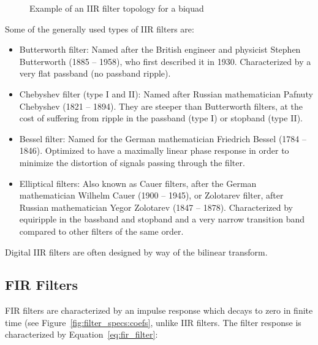 \begin{figure}
    \centering
    
    \caption[IIR Filter: Biquad]{Example of an IIR filter topology for a biquad}
    \label{fig:filtertopologies:iir}
\end{figure}

Some of the generally used types of IIR filters are:
\begin{itemize}\tightlist
    \item
        Butterworth  filter: Named after  the British  engineer and  physicist
        Stephen  Butterworth  (1885  --  1958),  who  first  described  it  in
        1930. Characterized by a very flat passband (no passband ripple).
    \item
        Chebyshev filter  (type I  and II): Named after  Russian mathematician
        Pafnuty Chebyshev  (1821 --  1894). They are steeper  than Butterworth
        filters, at the cost of suffering from ripple in the passband (type I)
        or stopband (type II).
    \item
        Bessel  filter: Named for  the German  mathematician Friedrich  Bessel
        (1784 -- 1846). Optimized to have a maximally linear phase response in
        order  to  minimize the  distortion  of  signals passing  through  the
        filter.
    \item
        Elliptical  filters: Also known  as  Cauer filters,  after the  German
        mathematician Wilhelm Cauer (1900 -- 1945), or Zolotarev filter, after
        Russian mathematician Yegor Zolotarev (1847 -- 1878). Characterized by
        equiripple in the  bassband and stopband and a  very narrow transition
        band compared to other filters of the same order.
\end{itemize}
Digital IIR filters are often designed by way of the bilinear transform.

%
%
\subsection{FIR Filters} %
\label{subsec:FIR_filters}

FIR filters are  characterized by an impulse response which  decays to zero in
finite time (see  Figure~\ref{fig:filter_specs:coefs}, unlike IIR filters. The
filter response is characterized by Equation~\ref{eq:fir_filter}:

